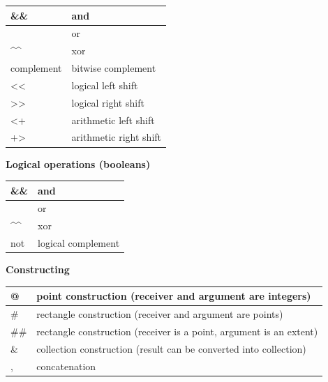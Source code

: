 \documentclass[letterpaper,10pt,english]{sphinxmanual}
\begin{document}
\begin{tabulary}{\linewidth}{p{5cm} p{10cm}}
\hline

\&\&
 & 
and
\\\hline

\textbar{}\textbar{}
 & 
or
\\\hline

\textasciicircum{}\textasciicircum{}
 & 
xor
\\\hline

complement
 & 
bitwise complement
\\\hline

\textless{}\textless{}
 & 
logical left shift
\\\hline

\textgreater{}\textgreater{}
 & 
logical right shift
\\\hline

\textless{}+
 & 
arithmetic left shift
\\\hline

+\textgreater{}
 & 
arithmetic right shift
\\\hline
\end{tabulary}


\textbf{Logical operations (booleans)}

\begin{tabulary}{\linewidth}{p{5cm} p{10cm}}
\hline

\&\&
 & 
and
\\\hline

\textbar{}\textbar{}
 & 
or
\\\hline

\textasciicircum{}\textasciicircum{}
 & 
xor
\\\hline

not
 & 
logical complement
\\\hline
\end{tabulary}


\textbf{Constructing}

\begin{tabulary}{\linewidth}{p{5cm} p{10cm}}
\hline

@
 & 
point construction (receiver and argument are integers)
\\\hline

\#
 & 
rectangle construction (receiver and argument are points)
\\\hline

\#\#
 & 
rectangle construction (receiver is a point, argument is an extent)
\\\hline

\&
 & 
collection construction (result can be converted into collection)
\\\hline

,
 & 
concatenation
\\\hline
\end{tabulary}
\end{document}
